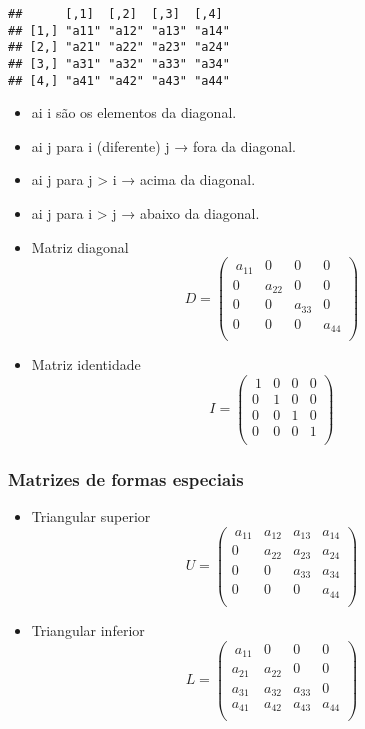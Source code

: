 \documentclass[
]{article}
\begin{document}
\begin{verbatim}
##      [,1]  [,2]  [,3]  [,4] 
## [1,] "a11" "a12" "a13" "a14"
## [2,] "a21" "a22" "a23" "a24"
## [3,] "a31" "a32" "a33" "a34"
## [4,] "a41" "a42" "a43" "a44"
\end{verbatim}

\begin{itemize}
\item
  ai i são os elementos da diagonal.
\item
  ai j para i (diferente) j → fora da diagonal.
\item
  ai j para j \textgreater{} i → acima da diagonal.
\item
  ai j para i \textgreater{} j → abaixo da diagonal.
\item
  Matriz diagonal \[D = \begin{pmatrix}\
  a_{11} & 0 & 0 & 0\\
  0 & a_{22} & 0 & 0\\
  0 & 0 & a_{33} & 0\\
  0 & 0 & 0 & a_{44}\\
  \end{pmatrix}\]
\item
  Matriz identidade \[I = \begin{pmatrix}\
  1 & 0 & 0 & 0\\
  0 & 1 & 0 & 0\\
  0 & 0 & 1 & 0 \\
  0 & 0 & 0 & 1\\
  \end{pmatrix}\]
\end{itemize}

\hypertarget{matrizes-de-formas-especiais-1}{%
\subsubsection{Matrizes de formas
especiais}\label{matrizes-de-formas-especiais-1}}

\begin{itemize}
\item
  Triangular superior \[U = \begin{pmatrix}\
  a_{11} & a_{12} & a_{13} & a_{14}\\
  0 & a_{22} & a_{23} & a_{24}\\
  0 & 0 & a_{33} & a_{34} \\
  0 & 0 & 0 & a_{44}\\
  \end{pmatrix}\]
\item
  Triangular inferior \[L = \begin{pmatrix}\
  a_{11} & 0 & 0 & 0\\
  a_{21} & a_{22} & 0 & 0\\
  a_{31} & a_{32} & a_{33} & 0 \\
  a_{41} & a_{42} & a_{43} & a_{44}\\
  \end{pmatrix}\]
\end{itemize}
\end{document}
